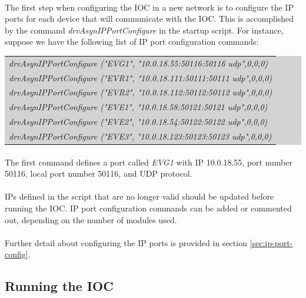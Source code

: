 \documentclass[openany]{article}
\begin{document}
		\paragraph{} The first step when configuring the IOC in a new network is to configure the IP ports for each device that will communicate with the IOC. This is accomplished by the command \emph{drvAsynIPPortConfigure} in the startup script. For instance, suppose we have the following list of IP port configuration commands:

		\bigskip
		\colorbox{lightgray}{
			\begin{tabularx}{0.9\textwidth}{X}
			\emph{drvAsynIPPortConfigure ("EVG1", "10.0.18.55:50116:50116 udp",0,0,0)} \\
			\emph{drvAsynIPPortConfigure ("EVR1", "10.0.18.111:50111:50111 udp",0,0,0)} \\
			\emph{drvAsynIPPortConfigure ("EVR2", "10.0.18.112:50112:50112 udp",0,0,0)} \\
			\emph{drvAsynIPPortConfigure ("EVE1", "10.0.18.58:50121:50121 udp",0,0,0)} \\
			\emph{drvAsynIPPortConfigure ("EVE2", "10.0.18.54:50122:50122 udp",0,0,0)} \\
			\emph{drvAsynIPPortConfigure ("EVE3", "10.0.18.123:50123:50123 udp",0,0,0)} \\
			\end{tabularx}
		}

		\paragraph{} The first command defines a port called \emph{EVG1} with IP 10.0.18.55, port number 50116, local port number 50116, and UDP protocol.
		\paragraph{} IPs defined in the script that are no longer valid should be updated before running the IOC. IP port configuration commands can be added or commented out, depending on the number of modules used.
		\paragraph{} Further detail about configuring the IP ports is provided in section \ref{sec:ip-port-config}.

	\subsection{Running the IOC}
\end{document}
